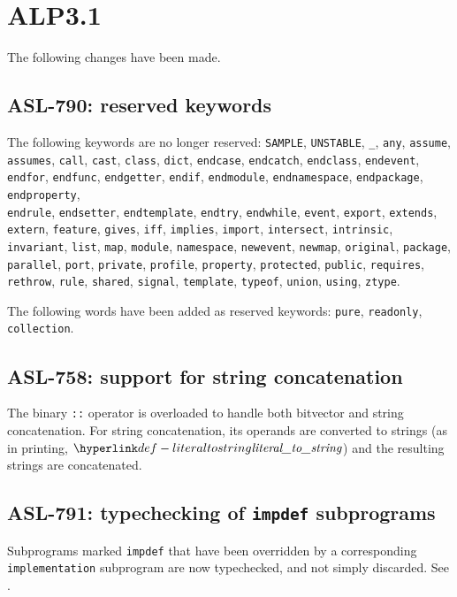 \section{ALP3.1}

The following changes have been made.

\subsection{ASL-790: reserved keywords}
The following keywords are no longer reserved:
%
\texttt{SAMPLE},
\texttt{UNSTABLE},
\texttt{\_},
\texttt{any},
\texttt{assume},
\texttt{assumes},
\texttt{call},
\texttt{cast},
\texttt{class},
\texttt{dict},
\texttt{endcase},
\texttt{endcatch},
\texttt{endclass},
\texttt{endevent},
\texttt{endfor},
\texttt{endfunc},
\texttt{endgetter},
\texttt{endif},
\texttt{endmodule},
\texttt{endnamespace},
\texttt{endpackage},
\texttt{endproperty},\\
\texttt{endrule},
\texttt{endsetter},
\texttt{endtemplate},
\texttt{endtry},
\texttt{endwhile},
\texttt{event},
\texttt{export},
\texttt{extends},
\texttt{extern},
\texttt{feature},
\texttt{gives},
\texttt{iff},
\texttt{implies},
\texttt{import},
\texttt{intersect},
\texttt{intrinsic},
\texttt{invariant},
\texttt{list},
\texttt{map},
\texttt{module},
\texttt{namespace},
\texttt{newevent},
\texttt{newmap},
\texttt{original},
\texttt{package},
\texttt{parallel},
\texttt{port},
\texttt{private},
\texttt{profile},
\texttt{property},
\texttt{protected},
\texttt{public},
\texttt{requires},
\texttt{rethrow},
\texttt{rule},
\texttt{shared},
\texttt{signal},
\texttt{template},
\texttt{typeof},
\texttt{union},
\texttt{using},
\texttt{ztype}.

The following words have been added as reserved keywords:
\texttt{pure}, \texttt{readonly}, \texttt{collection}.

\subsection{ASL-758: support for string concatenation}
The binary \texttt{::} operator is overloaded to handle both bitvector and string concatenation.
For string concatenation, its operands are converted to strings (as in printing, $\literaltostring$) and the resulting strings are concatenated.

\subsection{ASL-791: typechecking of \texttt{impdef} subprograms}
Subprograms marked \texttt{impdef} that have been overridden by a corresponding \texttt{implementation} subprogram are now typechecked, and not simply discarded.
See .

